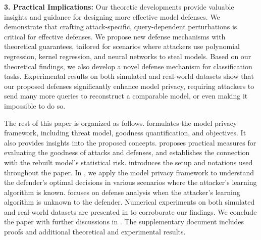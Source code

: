     \textbf{3. Practical Implications:} Our theoretic developments provide valuable insights and guidance for designing more effective model defenses. We demonstrate that crafting attack-specific, query-dependent perturbations is critical for effective defenses. We propose new defense mechanisms with theoretical guarantees, tailored for scenarios where attackers use polynomial regression, kernel regression, and neural networks to steal models. Based on our theoretical findings, we also develop a novel defense mechanism for classification tasks. Experimental results on both simulated and real-world datasets show that our proposed defenses significantly enhance model privacy, requiring attackers to send many more queries to reconstruct a comparable model, or even making it impossible to do so.
    

   
    The rest of this paper is organized as follows.  formulates the model privacy framework, including threat model, goodness quantification, and objectives. It also provides insights into the proposed concepts.  proposes practical measures for evaluating the goodness of attacks and defenses, and establishes the connection with the rebuilt model's statistical risk.  introduces the setup and notations used throughout the paper. In , we apply the model privacy framework to understand the defender's optimal decisions in various scenarios where the attacker's learning algorithm is known.  focuses on defense analysis when the attacker's learning algorithm is unknown to the defender. Numerical experiments on both simulated and real-world datasets are presented in  to corroborate our findings. We conclude the paper with further discussions in . The supplementary document includes proofs and additional theoretical and experimental results.

